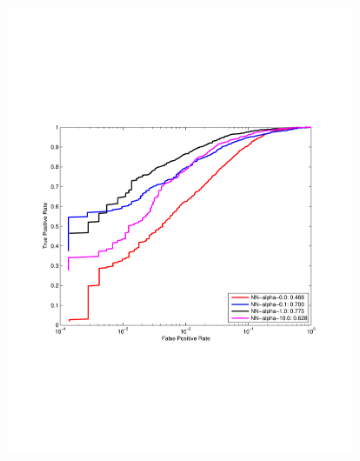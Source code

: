 \begin{figure}[h]
  \centering
  \begin{subfigure}[b]{0.49\textwidth}
   \includegraphics[width=\textwidth]{figures/NN-alpha.pdf}
    \caption{}
    \label{fig:NNa}
  \end{subfigure}
  \begin{subfigure}[b]{0.49\textwidth}

\end{subfigure}
\end{figure}
